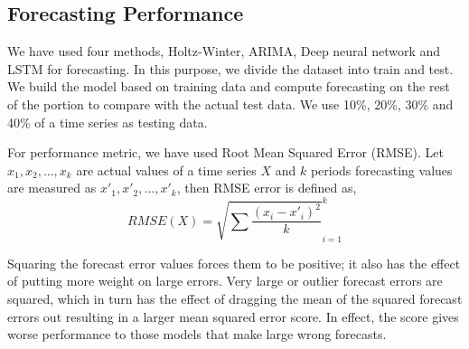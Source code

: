 \subsection{Forecasting Performance} 
We have used four methods, Holtz-Winter, ARIMA, Deep neural network and LSTM for forecasting. In this purpose, we divide the dataset into train and test. We build the model based on training data and compute forecasting on the rest of the portion to compare with the actual test data. We use 10\%, 20\%, 30\% and 40\% of a time series as testing data. 

For performance metric, we have used Root Mean Squared Error (RMSE). Let $x_1, x_2, \dots ,x_k$ are actual values of a time series $X$ and $k$ periods forecasting values are measured as $x'_1, x'_2, \dots ,x'_k$, then RMSE error is defined as,
\[ RMSE(X) = \sqrt{\sum{\frac{(x_i-x'_i)^2}{k}}}_{i=1}^{k}\]


Squaring the forecast error values forces them to be positive; it also has the effect of putting more weight on large errors.
Very large or outlier forecast errors are squared, which in turn has the effect of dragging the mean of the squared forecast errors out resulting in a larger mean squared error score. In effect, the score gives worse performance to those models that make large wrong forecasts.